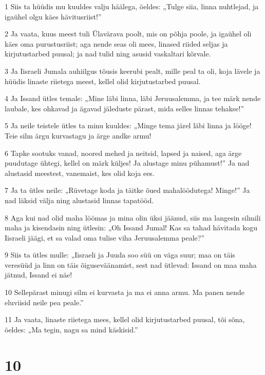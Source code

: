 \par 1 Siis ta hüüdis mu kuuldes valju häälega, öeldes: „Tulge siia, linna nuhtlejad, ja igaühel olgu käes hävitusriist!”
\par 2 Ja vaata, kuus meest tuli Ülavärava poolt, mis on põhja poole, ja igaühel oli käes oma purustusriist; aga nende seas oli mees, linased riided seljas ja kirjutustarbed puusal; ja nad tulid ning asusid vaskaltari kõrvale.
\par 3 Ja Iisraeli Jumala auhiilgus tõusis keerubi pealt, mille peal ta oli, koja lävele ja hüüdis linaste riietega meest, kellel olid kirjutustarbed puusal.
\par 4 Ja Issand ütles temale: „Mine läbi linna, läbi Jeruusalemma, ja tee märk nende laubale, kes ohkavad ja ägavad jäleduste pärast, mida selles linnas tehakse!”
\par 5 Ja neile teistele ütles ta minu kuuldes: „Minge tema järel läbi linna ja lööge! Teie silm ärgu kurvastagu ja ärge andke armu!
\par 6 Tapke sootuks vanad, noored mehed ja neitsid, lapsed ja naised, aga ärge puudutage ühtegi, kellel on märk küljes! Ja alustage minu pühamust!” Ja nad alustasid meestest, vanemaist, kes olid koja ees.
\par 7 Ja ta ütles neile: „Rüvetage koda ja täitke õued mahalöödutega! Minge!” Ja nad läksid välja ning alustasid linnas tapatööd.
\par 8 Aga kui nad olid maha löömas ja mina olin üksi jäänud, siis ma langesin silmili maha ja kisendasin ning ütlesin: „Oh Issand Jumal! Kas sa tahad hävitada kogu Iisraeli jäägi, et sa valad oma tulise viha Jeruusalemma peale?”
\par 9 Siis ta ütles mulle: „Iisraeli ja Juuda soo süü on väga suur; maa on täis veresüüd ja linn on täis õiguseväänamist, sest nad ütlevad: Issand on maa maha jätnud, Issand ei näe!
\par 10 Sellepärast minugi silm ei kurvasta ja ma ei anna armu. Ma panen nende eluviisid neile pea peale.”
\par 11 Ja vaata, linaste riietega mees, kellel olid kirjutustarbed puusal, tõi sõna, öeldes: „Ma tegin, nagu sa mind käskisid.”

\chapter{10}

